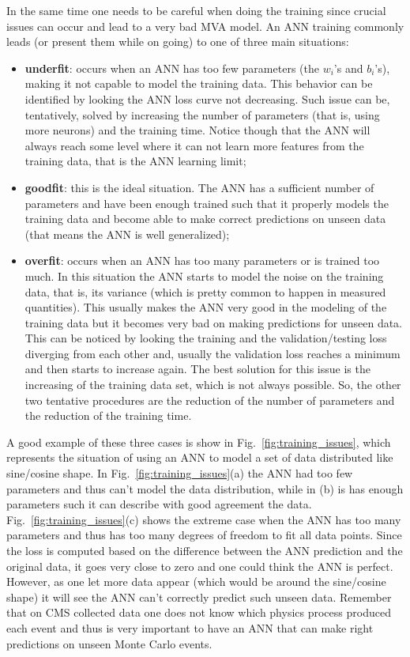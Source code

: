 In the same time one needs to be careful when doing the training since crucial issues can occur and lead to a very bad MVA model. An ANN training commonly leads (or present them while on going) to one of three main situations: 
\begin{itemize}
\item \textbf{underfit}: occurs when an ANN has too few parameters (the $w_i$'s and $b_i$'s), making it not capable to model the training data. This behavior can be identified by looking the ANN loss curve not decreasing. Such issue can be, tentatively, solved by increasing the number of parameters (that is, using more neurons) and the training time. Notice though that the ANN will always reach some level where it can not learn more features from the training data, that is the ANN learning limit;
\item \textbf{goodfit}: this is the ideal situation. The ANN has a sufficient number of parameters and have been enough trained such that it properly models the training data and become able to make correct predictions on unseen data (that means the ANN is well generalized);
\item \textbf{overfit}: occurs when an ANN has too many parameters or is trained too much. In this situation the ANN starts to model the noise on the training data, that is, its variance (which is pretty common to happen in measured quantities). This usually makes the ANN very good in the modeling of the training data but it becomes very bad on making predictions for unseen data. This can be noticed by looking the training and the validation/testing loss diverging from each other and, usually the validation loss reaches a minimum and then starts to increase again. The best solution for this issue is the increasing of the training data set, which is not always possible. So, the other two tentative procedures are the reduction of the number of parameters and the reduction of the training time.
\end{itemize}

A good example of these three cases is show in Fig.~\ref{fig:training_issues}, which represents the situation of using an ANN to model a set of data distributed like sine/cosine shape. In Fig.~\ref{fig:training_issues}(a) the ANN had too few parameters and thus can't model the data distribution, while in (b) is has enough parameters such it can describe with good agreement the data. Fig.~\ref{fig:training_issues}(c) shows the extreme case when the ANN has too many parameters and thus has too many degrees of freedom to fit all data points. Since the loss is computed based on the difference between the ANN prediction and the original data, it goes very close to zero and one could think the ANN is perfect. However, as one let more data appear (which would be around the sine/cosine shape) it will see the ANN can't correctly predict such unseen data. Remember that on CMS collected data one does not know which physics process produced each event and thus is very important to have an ANN that can make right predictions on unseen Monte Carlo events.

